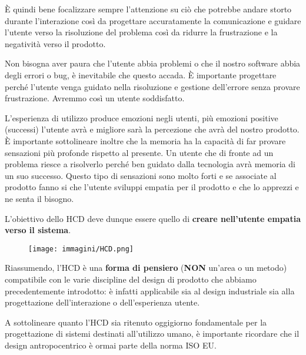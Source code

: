 \`E quindi bene focalizzare sempre l'attenzione su ciò che potrebbe andare storto durante l'interazione così da progettare accuratamente la comunicazione
e guidare l'utente verso la risoluzione del problema così da ridurre la frustrazione e la negatività verso il prodotto. 

Non bisogna aver paura che l'utente abbia problemi o che il nostro software abbia degli errori o bug, è inevitabile che questo accada. \`E importante
progettare perché l'utente venga guidato nella risoluzione e gestione dell'errore senza provare frustrazione. Avremmo così un utente soddisfatto. 

L'esperienza di utilizzo produce emozioni negli utenti, più emozioni positive (successi) l'utente avrà e migliore sarà la percezione che avrà del
nostro prodotto. \`E importante sottolineare inoltre che la memoria ha la capacità di far provare sensazioni più profonde rispetto al presente. Un
utente che di fronte ad un problema riesce a risolverlo perché ben guidato dalla tecnologia avrà memoria di un suo successo. Questo tipo di sensazioni
sono molto forti e se associate al prodotto fanno si che l'utente sviluppi empatia per il prodotto e che lo apprezzi e ne senta il bisogno.

L'obiettivo dello HCD deve dunque essere quello di \textbf{creare nell'utente empatia verso il sistema}.


\begin{figure}[!h]
	\centering
	\texttt{[image: immagini/HCD.png]}
\end{figure}

Riassumendo, l'HCD è una \textbf{forma di pensiero} (\textbf{NON} un'area o un metodo) compatibile con le varie discipline del design di prodotto che
abbiamo precedentemente introdotto: è infatti applicabile sia al design industriale sia alla progettazione dell'interazione o
dell'esperienza utente.

A sottolineare quanto l'HCD sia ritenuto oggigiorno fondamentale per la progettazione di sistemi destinati all'utilizzo umano, è
importante ricordare che il design antropocentrico è ormai parte della norma ISO EU.

